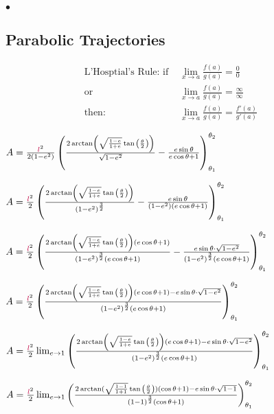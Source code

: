 $•$\subsection{Parabolic Trajectories}


\begin{flushleft}

\begin{align*}		
\text{L'Hosptial's Rule: if }&\lim_{x\rightarrow a}\frac{f(a)}{g(a)}=\frac{0}{0} && \\
\text{or }& \lim_{x\rightarrow a}\frac{f(a)}{g(a)}=\frac{\infty}{\infty}\\
\text{then: }&\lim_{x\rightarrow a}\frac{f(a)}{g(a)}=\frac{f'(a)}{g'(a)}
\end{align*}	

\bigskip		

$A=\frac{\textcolor{purple}{l}^2}{2(1-\textcolor{black}{e}^2)} \left(
\frac{2\arctan\left(\sqrt{\frac{1-\textcolor{black}{e}}{1+\textcolor{black}{e}}}\tan{\left(\frac{\theta}{2}\right)}\right)}{\sqrt{1-\textcolor{black}{e}^2}}
-\frac{\textcolor{black}{e}\sin{\theta}}{\textcolor{black}{e}\cos{\theta}+1}\right)_{\theta_1}^{\theta_2}
$

$A=\frac{\textcolor{purple}{l}^2}{2} \left(
\frac{2\arctan\left(\sqrt{\frac{1-\textcolor{black}{e}}{1+\textcolor{black}{e}}}\tan{\left(\frac{\theta}{2}\right)}\right)}{(1-\textcolor{black}{e}^2)^{\frac{3}{2}}}
-\frac{\textcolor{black}{e}\sin{\theta}}{(1-\textcolor{black}{e}^2)(\textcolor{black}{e}\cos{\theta}+1)}\right)_{\theta_1}^{\theta_2}$

$A=\frac{\textcolor{purple}{l}^2}{2} \left(
\frac{2\arctan\left(\sqrt{\frac{1-\textcolor{black}{e}}{1+\textcolor{black}{e}}}\tan{\left(\frac{\theta}{2}\right)}\right)(\textcolor{black}{e}\cos{\theta}+1)}{(1-\textcolor{black}{e}^2)^{\frac{3}{2}}(\textcolor{black}{e}\cos{\theta}+1)}
-\frac{\textcolor{black}{e}\sin{\theta}\cdot\sqrt{1-\textcolor{black}{e}^2}}{(1-\textcolor{black}{e}^2)^{\frac{3}{2}}(\textcolor{black}{e}\cos{\theta}+1)}\right)_{\theta_1}^{\theta_2}$

$A=\frac{\textcolor{purple}{l}^2}{2} \left(
\frac{2\arctan\left(\sqrt{\frac{1-\textcolor{black}{e}}{1+\textcolor{black}{e}}}\tan{\left(\frac{\theta}{2}\right)}\right)(\textcolor{black}{e}\cos{\theta}+1)-\textcolor{black}{e}\sin{\theta}\cdot\sqrt{1-\textcolor{black}{e}^2}}{(1-\textcolor{black}{e}^2)^{\frac{3}{2}}(\textcolor{black}{e}\cos{\theta}+1)}
\right)_{\theta_1}^{\theta_2}$

$A=\frac{\textcolor{purple}{l}^2}{2}\lim_{e\rightarrow 1} \left(
\frac{2\arctan\left(\sqrt{\frac{1-\textcolor{black}{e}}{1+\textcolor{black}{e}}}\tan{\left(\frac{\theta}{2}\right)}\right)(\textcolor{black}{e}\cos{\theta}+1)-\textcolor{black}{e}\sin{\theta}\cdot\sqrt{1-\textcolor{black}{e}^2}}{(1-\textcolor{black}{e}^2)^{\frac{3}{2}}(\textcolor{black}{e}\cos{\theta}+1)}
\right)_{\theta_1}^{\theta_2}$

$A=\frac{\textcolor{purple}{l}^2}{2}\lim_{e\rightarrow 1} \left(
\frac{2\arctan(\sqrt{\frac{1-1}{1+1}}\tan{\left(\frac{\theta}{2}\right)})(\cos{\theta}+1)-\textcolor{black}{e}\sin{\theta}\cdot\sqrt{1-1}}{(1-1)^{\frac{3}{2}}(\cos{\theta}+1)}
\right)_{\theta_1}^{\theta_2}$


\end{flushleft}
